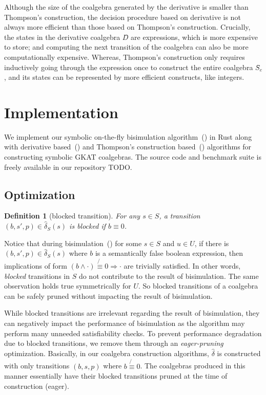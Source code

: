 \documentclass[conference]{IEEEtran}
\newtheorem{definition}{Definition}
\begin{document}
Although the size of the coalgebra generated by the derivative is smaller than Thompson's construction, the decision procedure based on derivative is not always more efficient than those based on Thompson's construction. 
Crucially, the states in the derivative coalgebra \(D̂\) are expressions, which is more expensive to store; and computing the next transition of the coalgebra can also be more computationally expensive.
Whereas, Thompson's construction only requires inductively going through the expression once to construct the entire coalgebra \(Ŝ_{e}\), and its states can be represented by more efficient constructs, like integers. 

\section{Implementation}
We implement our symbolic on-the-fly bisimulation algorithm~() in Rust along with derivative based~() and Thompson's construction based~() algorithms for constructing symbolic GKAT coalgebras. The source code and benchmark suite is freely available in our repository TODO.

\subsection{Optimization}\label{sec:optimization-implementation}
\begin{definition}[blocked transition]
    For any \(s \in S\), a transition \((b, s', p) \in \hat{\delta}_S(s)\) is blocked if \(b \equiv 0\).
\end{definition}

Notice that during bisimulation~() for some \(s \in S\) and \(u \in U\), if there is \((b,s',p) \in \hat{\delta}_S(s)\) where \(b\) is a semantically false boolean expression, then implications of form \((b \land \cdot) \not{\equiv} 0 \Rightarrow \cdot\) are trivially satisfied. In other words, \textit{blocked} transitions in \(S\) do not contribute to the result of bisimulation. The same observation holds true symmetrically for \(U\). So blocked transitions of a coalgebra can be safely pruned without impacting the result of bisimulation.

While blocked transitions are irrelevant regarding the result of bisimulation, they can negatively impact the performance of bisimulation as the algorithm may perform many unneeded satisfiability checks. To prevent performance degradation due to blocked transitions, we remove them through an \textit{eager-pruning} optimization. Basically, in our coalgebra construction algorithms, \(\hat{\delta}\) is constructed with only transitions \((b, s, p)\) where \(b \not{\equiv} 0\). The coalgebras produced in this manner essentially have their blocked transitions pruned at the time of construction (eager). 
\end{document}
